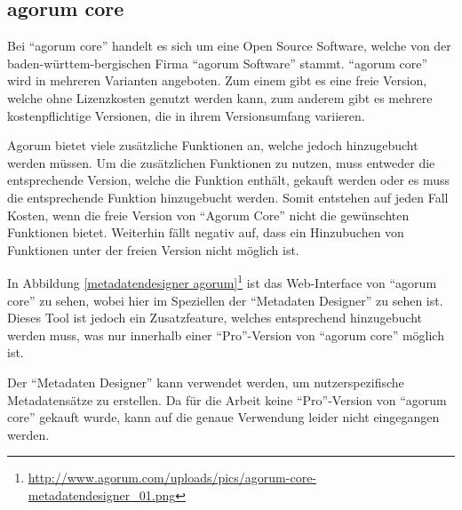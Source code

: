 
\subsection{agorum core} \label{Agorum Core}
Bei "`agorum core"' handelt es sich um eine Open Source Software, welche von der baden-w\"urttem-bergischen Firma "`agorum Software"' stammt. "`agorum core"' wird in mehreren Varianten angeboten. Zum einem gibt es eine freie Version, welche ohne Lizenzkosten genutzt werden kann, zum anderem gibt es mehrere kostenpflichtige Versionen, die in ihrem Versionsumfang variieren. \cite{agorum_home} 

Agorum bietet viele zus\"atzliche Funktionen an, welche jedoch hinzugebucht werden m\"ussen. Um die zus\"atzlichen Funktionen zu nutzen, muss entweder die entsprechende Version, welche die Funktion enth\"alt, gekauft werden oder es muss die entsprechende Funktion hinzugebucht werden.
Somit entstehen auf jeden Fall Kosten, wenn die freie Version von "`Agorum Core"' nicht die gew\"unschten Funktionen bietet. Weiterhin f\"allt negativ auf, dass ein Hinzubuchen von Funktionen unter der freien Version nicht m\"oglich ist. \cite{agorum_preise} \cite{Eval_DMS_Bachelor}

In Abbildung \ref{metadatendesigner agorum}\footnote{\url{http://www.agorum.com/uploads/pics/agorum-core-metadatendesigner_01.png}} ist das Web-Interface von "`agorum core"' zu sehen, wobei hier im Speziellen der "`Metadaten Designer"' zu sehen ist. Dieses Tool ist jedoch ein Zusatzfeature, welches entsprechend hinzugebucht werden muss, was nur innerhalb einer "`Pro"'-Version von "`agorum core"' m\"oglich ist. \cite{agorum_metadesigner_bild}

Der "`Metadaten Designer"' kann verwendet werden, um nutzerspezifische Metadatens\"atze zu erstellen.  Da f\"ur die Arbeit keine "`Pro"'-Version von "`agorum core"' gekauft wurde, kann auf die genaue Verwendung leider nicht eingegangen werden. \cite{agorum_metadaten_designer_video}

